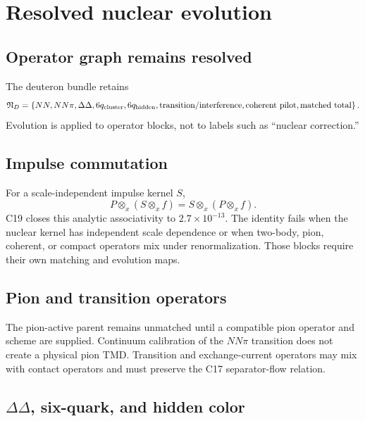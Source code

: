 \documentclass[11pt]{article}
\newcommand{\otimesx}{\mathbin{\otimes_x}}
\begin{document}
\section{Resolved nuclear evolution}
\label{sec:nuclear-evolution}

\subsection{Operator graph remains resolved}

The deuteron bundle retains
\begin{equation}
 \mathfrak N_D=
 \left
 \{
 NN,
 NN\pi,
 \Delta\Delta,
 6q_{\rm cluster},
 6q_{\rm hidden},
 \text{transition/interference},
 \text{coherent pilot},
 \text{matched total}
 \right\}.
 \label{eq:nuclear-identity}
\end{equation}
Evolution is applied to operator blocks, not to labels such as ``nuclear correction.''

\subsection{Impulse commutation}

For a scale-independent impulse kernel \(S\),
\begin{equation}
 P\otimesx(S\otimesx f)
 =
 S\otimesx(P\otimesx f).
 \label{eq:impulse-commutation}
\end{equation}
C19 closes this analytic associativity to \(2.7\times10^{-13}\).  The identity fails when the nuclear kernel has independent scale dependence or when two-body, pion, coherent, or compact operators mix under renormalization.  Those blocks require their own matching and evolution maps.

\subsection{Pion and transition operators}

The pion-active parent remains unmatched until a compatible pion operator and scheme are supplied.  Continuum calibration of the \(NN\pi\) transition does not create a physical pion TMD.  Transition and exchange-current operators may mix with contact operators and must preserve the C17 separator-flow relation.

\subsection{\texorpdfstring{\(\Delta\Delta\)}{DeltaDelta}, six-quark, and hidden color}
\end{document}
